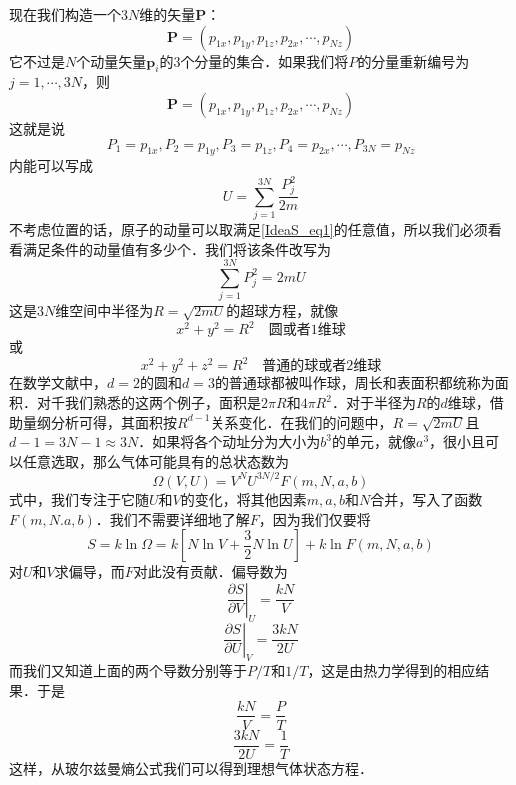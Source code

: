现在我们构造一个$3N $维的矢量$\mathbf P$：
\begin{equation}
\mathbf{P}=\left( p_{1x},p_{1y},p_{1z},p_{2x},\cdots ,p_{Nz} \right) 
\end{equation}
它不过是$N$个动量矢量$\boldsymbol p_i$的$3 $个分量的集合．如果我们将$P $的分量重新编号为$j=1, \cdots , 3N$，则
\begin{equation}
\mathbf{P}=\left( p_{1x},p_{1y},p_{1z},p_{2x},\cdots ,p_{Nz} \right) 
\end{equation}
这就是说
\begin{equation}
P_1=p_{1x},P_2=p_{1y},P_3=p_{1z},P_4=p_{2x},\cdots ,P_{3N}=p_{Nz}
\end{equation}
内能可以写成
\begin{equation} \label{IdeaS_eq1}
U=\sum_{j=1}^{3N}{\frac{P_{j}^{2}}{2m}}
\end{equation}
不考虑位置的话，原子的动量可以取满足\eqref{IdeaS_eq1}的任意值，所以我们必须看看满足条件的动量值有多少个．我们将该条件改写为
\begin{equation}
\sum_{j=1}^{3N}{P_{j}^{2}}=2mU
\end{equation}
这是$3N$维空间中半径为$R=\sqrt{2mU}$的超球方程，就像
\begin{equation}
x^2+y^2=R^2 \quad \text{圆或者1维球}
\end{equation}
或
\begin{equation}
x^2+y^2+z^2=R^2 \quad \text{普通的球或者2维球}
\end{equation}
在数学文献中，$ d=2 $的圆和$d=3 $的普通球都被叫作球，周长和表面积都统称为面积．对千我们熟悉的这两个例子，面积是$2\pi R$和$4\pi R^2$．对于半径为$R $的$d $维球，借助量纲分析可得，其面积按$R^{d-1}$关系变化．在我们的问题中，$R=\sqrt{2mU}$且$d-1 = 3N-1 \approx 3N$．如果将各个动址分为大小为$b^3$的单元，就像$a^3$，很小且可以任意选取，那么气体可能具有的总状态数为
\begin{equation}
\Omega \left( V,U \right) =V^NU^{3N/2}F\left( m,N,a,b \right) 
\end{equation}
式中，我们专注于它随$U $和$V $的变化，将其他因素$m, a, b $和$N $合并，写入了函数$F(m, N. a, b) $．我们不需要详细地了解$F$，因为我们仅要将
\begin{equation}
S=k\ln \Omega =k\left[ N\ln V+\frac{3}{2}N\ln U \right] +k\ln F\left( m,N,a,b \right) 
\end{equation}
对$U $和$V $求偏导，而$F $对此没有贡献．偏导数为
\begin{equation}
\left. \frac{\partial S}{\partial V} \right |_{U}^{}=\frac{kN}{V}
\end{equation}
\begin{equation}
\left. \frac{\partial S}{\partial U}\right |_{V}^{}=\frac{3kN}{2U}
\end{equation}
而我们又知道上面的两个导数分别等于$P/T$和$1/T$，这是由热力学得到的相应结果．于是
\begin{equation}
\dfrac{kN}{V}=\dfrac{P}{T}
\end{equation}
\begin{equation}
\dfrac{3kN}{2U} = \dfrac{1}{T}
\end{equation}
这样，从玻尔兹曼熵公式我们可以得到理想气体状态方程．